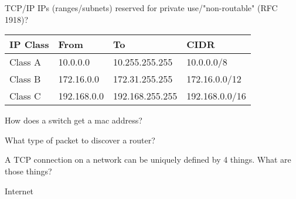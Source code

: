 \begin{questions}{TCP/IP}
	IPs (ranges/subnets) reserved for private use/"non-routable" (RFC 1918)?\\
	\begin{tabular}{llll}
		\textbf{IP Class} &\textbf{From} &\textbf{To} &\textbf{CIDR}\\\hline
		Class A& 10.0.0.0& 10.255.255.255& 10.0.0.0/8\\
		Class B& 172.16.0.0& 172.31.255.255& 172.16.0.0/12\\
		Class C& 192.168.0.0& 192.168.255.255& 192.168.0.0/16\\ \hline
	\end{tabular}

How does a switch get a mac address?

What type of packet to discover a router?

A TCP connection on a network can be uniquely defined by 4 things. What are those things?

\end{questions}

\begin{questions}{Internet}
	\begin{questionAnswer}
	\end{questionAnswer}
\end{questions}


